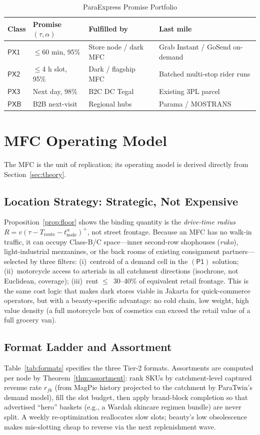 \documentclass[journal]{IEEEtran}
\begin{document}
\begin{table}[!t]
\caption{ParaExpress Promise Portfolio}
\label{tab:sla}
\centering
\scriptsize
\begin{tabularx}{\columnwidth}{@{}l l l X@{}}
\toprule
\textbf{Class} & \textbf{Promise} $(\tau,\alpha)$ & \textbf{Fulfilled by} & \textbf{Last mile} \\
\midrule
$\mathsf{PX1}$ & $\le$60 min, 95\% & Store node / dark MFC & Grab Instant / GoSend on-demand \\
$\mathsf{PX2}$ & $\le$4 h slot, 95\% & Dark / flagship MFC & Batched multi-stop rider runs \\
$\mathsf{PX3}$ & Next day, 98\% & B2C DC Tegal & Existing 3PL parcel \\
$\mathsf{PXB}$ & B2B next-visit & Regional hubs & Parama / MOSTRANS \\
\bottomrule
\end{tabularx}
\end{table}

\section{MFC Operating Model}
\label{sec:fc}
The MFC is the unit of replication; its operating model is derived directly from Section~\ref{sec:theory}.

\subsection{Location Strategy: Strategic, Not Expensive}
Proposition~\ref{prop:floor} shows the binding quantity is the \emph{drive-time radius} $R = v(\tau - T_{\mathrm{route}} - t^{\alpha}_{\mathrm{node}})^+$, not street frontage. Because an MFC has no walk-in traffic, it can occupy Class-B/C space---inner second-row shophouses (\emph{ruko}), light-industrial mezzanines, or the back rooms of existing consignment partners---selected by three filters: (i)~centroid of a demand cell in the $(\mathsf{P1})$ solution; (ii)~motorcycle access to arterials in all catchment directions (isochrone, not Euclidean, coverage); (iii)~rent $\le$~30--40\% of equivalent retail frontage. This is the same cost logic that makes dark stores viable in Jakarta for quick-commerce operators, but with a beauty-specific advantage: no cold chain, low weight, high value density (a full motorcycle box of cosmetics can exceed the retail value of a full grocery van).

\subsection{Format Ladder and Assortment}
Table~\ref{tab:formats} specifies the three Tier-2 formats. Assortments are computed per node by Theorem~\ref{thm:assortment}: rank SKUs by catchment-level captured revenue rate $r_{fk}$ (from MagPie history projected to the catchment by ParaTwin's demand model), fill the slot budget, then apply brand-block completion so that advertised ``hero'' baskets (e.g., a Wardah skincare regimen bundle) are never split. A weekly re-optimization reallocates slow slots; beauty's low obsolescence makes mis-slotting cheap to reverse via the next replenishment wave.
\end{document}

